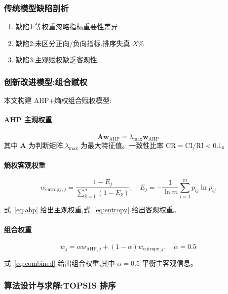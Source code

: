 \documentclass[12pt,a4paper]{ctexart}
\begin{document}
\subsubsection{传统模型缺陷剖析}
\begin{enumerate}
  \item 缺陷1:等权重忽略指标重要性差异
  \item 缺陷2:未区分正向/负向指标,排序失真 $X\%$
  \item 缺陷3:主观赋权缺乏客观性
\end{enumerate}

\subsubsection{创新改进模型:组合赋权}
本文构建 AHP+熵权组合赋权模型:
\paragraph{AHP 主观权重}
\begin{equation}
\mathbf{A} \mathbf{w}_{\text{AHP}} = \lambda_{\max} \mathbf{w}_{\text{AHP}}
\label{eq:ahp}
\end{equation}
其中 $\mathbf{A}$ 为判断矩阵,$\lambda_{\max}$ 为最大特征值。一致性比率 $\text{CR} = \text{CI}/\text{RI} < 0.1$。

\paragraph{熵权客观权重}
\begin{equation}
w_{\text{entropy},j} = \frac{1 - E_j}{\sum_{k=1}^{n} (1 - E_k)}, \quad E_j = -\frac{1}{\ln m} \sum_{i=1}^{m} p_{ij} \ln p_{ij}
\label{eq:entropy}
\end{equation}

式~\eqref{eq:ahp} 给出主观权重,式~\eqref{eq:entropy} 给出客观权重。

\paragraph{组合权重}
\begin{equation}
w_j = \alpha w_{\text{AHP},j} + (1 - \alpha) w_{\text{entropy},j}, \quad \alpha = 0.5
\label{eq:combined}
\end{equation}

式~\eqref{eq:combined} 给出组合权重,其中 $\alpha = 0.5$ 平衡主客观信息。

\subsubsection{算法设计与求解:TOPSIS 排序}
\end{document}
